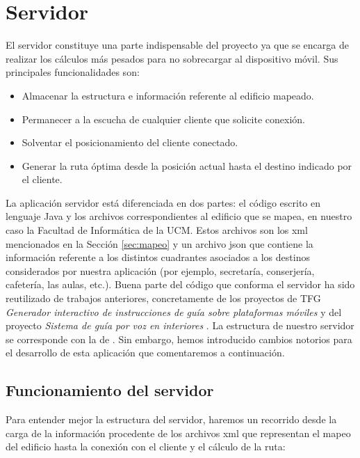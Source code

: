 \section{Servidor}
\label{sec:servidor}
El servidor constituye una parte indispensable del proyecto ya que se encarga de realizar los cálculos más pesados para no sobrecargar al dispositivo móvil. Sus principales funcionalidades son:
\begin{itemize}
	\item Almacenar la estructura e información referente al edificio mapeado.
	\item Permanecer a la escucha de cualquier cliente que solicite conexión.
	\item Solventar el posicionamiento del cliente conectado.
	\item Generar la ruta óptima desde la posición actual hasta el destino indicado por el cliente.
\end{itemize} 

La aplicación servidor está diferenciada en dos partes: el código escrito en lenguaje Java y los archivos correspondientes al edificio que se mapea, en nuestro caso la Facultad de Informática de la UCM. Estos archivos son los xml mencionados en la Sección \ref{sec:mapeo} y un archivo json que contiene la información referente a los distintos cuadrantes asociados a los destinos considerados por nuestra aplicación (por ejemplo, secretaría, conserjería, cafetería, las aulas,  etc.). 
Buena parte del código que conforma el servidor ha sido reutilizado de trabajos anteriores, concretamente de los proyectos de TFG \textit{Generador interactivo de instrucciones de guía sobre plataformas móviles} \citep{TFGguia} y del proyecto \textit{Sistema de guía por voz en interiores} \citep{TFGMariana}. La estructura de nuestro servidor se corresponde con la de \cite{TFGguia}. Sin embargo, hemos introducido cambios notorios para el desarrollo de esta aplicación que comentaremos a continuación.

\subsection{Funcionamiento del servidor}
\label{sub:func_servidor}

Para entender mejor la estructura del servidor, haremos un recorrido desde la carga de la información procedente de los archivos xml que representan el mapeo del edificio hasta la conexión con el cliente y el cálculo de la ruta: 


